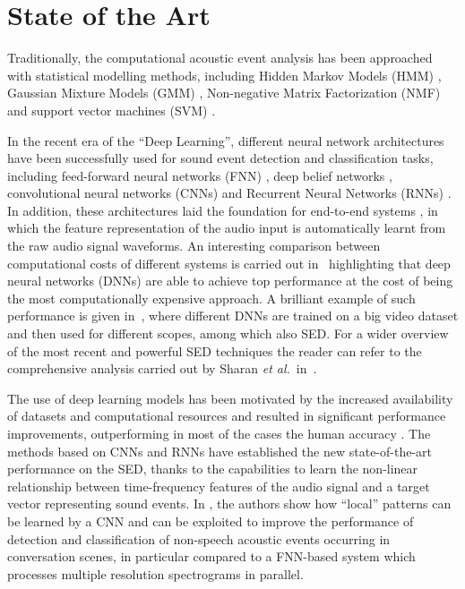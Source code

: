 \section{State of the Art}

Traditionally, the computational acoustic event analysis has been approached with statistical modelling methods, including Hidden Markov Models (HMM) \cite{degara2011onset}, Gaussian Mixture Models (GMM) \cite{heittola2010audio}, Non-negative Matrix Factorization (NMF) \cite{carabias2011musical} and support vector machines (SVM) \cite{guo2003content}. 

In the recent era of the ``Deep Learning'', different neural network architectures have been successfully used for sound event detection and classification tasks, including feed-forward neural networks (FNN) \cite{mcloughlin2015robust}, deep belief networks \cite{mohamed2012acoustic}, convolutional neural networks (CNNs) \cite{piczak2015environmental} and Recurrent Neural Networks (RNNs) \cite{graves2013speech}. In addition, these architectures laid the foundation for end-to-end systems \cite{trigeorgis2016adieu, wu2017end}, in which the feature representation of the audio input is automatically learnt from the raw audio signal waveforms. An interesting comparison between computational costs of different systems is carried out in~\cite{sigtia2016automatic} highlighting that deep neural networks (DNNs) are able to achieve top performance at the cost of being the most computationally expensive approach. A brilliant example of such performance is given in~\cite{hershey2016cnn}, where different DNNs are trained on a big video dataset and then used for different scopes, among which also SED. For a wider overview of the most recent and powerful SED techniques the reader can refer to the comprehensive analysis carried out by Sharan \emph{et al.}\ in~\cite{sharan2016overview}.

The use of deep learning models has been motivated by the increased availability of datasets and computational resources and resulted in significant performance improvements, outperforming in most of the cases the human accuracy \cite{sailor2017unsupervised}.
The methods based on CNNs and RNNs have established the new state-of-the-art performance on the SED, thanks to the capabilities to learn the non-linear relationship between time-frequency features of the audio signal and a target vector representing sound events. In \cite{espi2015}, the authors show how ``local'' patterns can be learned by a CNN and can be exploited to improve the performance of detection and classification of non-speech acoustic events occurring in conversation scenes, in particular compared to a FNN-based system which processes multiple resolution spectrograms in parallel. 


